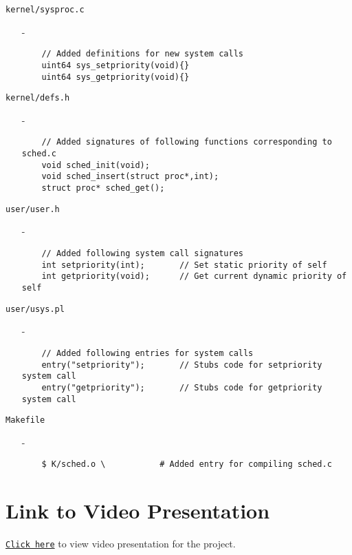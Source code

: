 \documentclass[11pt]{article}
\begin{document}
\texttt{kernel/sysproc.c}
\begin{enumerate}
    \item[-]\begin{verbatim}
    // Added definitions for new system calls
    uint64 sys_setpriority(void){}
    uint64 sys_getpriority(void){}
    \end{verbatim}
\end{enumerate}

\texttt{kernel/defs.h}
\begin{enumerate}
    \item[-]\begin{verbatim}
    // Added signatures of following functions corresponding to sched.c
    void sched_init(void);
    void sched_insert(struct proc*,int);
    struct proc* sched_get();
    \end{verbatim}
\end{enumerate}

\texttt{user/user.h}
\begin{enumerate}
    \item[-]\begin{verbatim}
    // Added following system call signatures
    int setpriority(int);       // Set static priority of self
    int getpriority(void);      // Get current dynamic priority of self
    \end{verbatim}
\end{enumerate}

\texttt{user/usys.pl}
\begin{enumerate}
    \item[-]\begin{verbatim}
    // Added following entries for system calls
    entry("setpriority");       // Stubs code for setpriority system call
    entry("getpriority");       // Stubs code for getpriority system call
    \end{verbatim}
\end{enumerate}

\texttt{Makefile}
\begin{enumerate}
    \item[-]\begin{verbatim}
    $ K/sched.o \           # Added entry for compiling sched.c
    \end{verbatim}
\end{enumerate}

\vspace{10mm}

\section{Link to Video Presentation}
\hspace{10mm}\href{https://drive.google.com/drive/folders/1CAjgVY1uFDAf2efwOkXkNsr0Bdo26XZ_?usp=sharing}{\texttt{Click here}} to view video presentation for the project.
\end{document}
